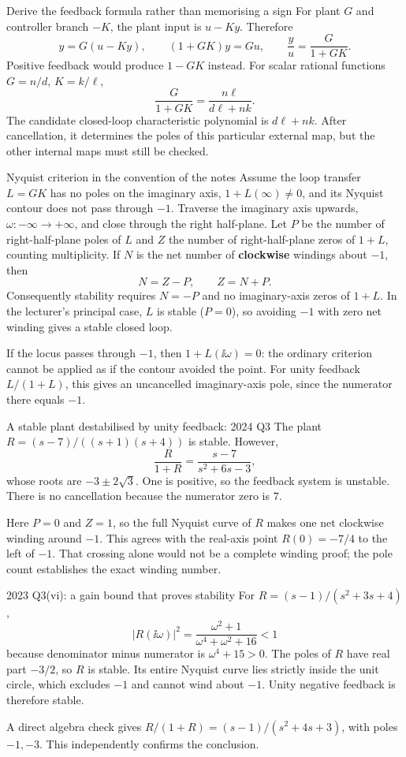 \begin{concept}{Derive the feedback formula rather than memorising a sign}
For plant $G$ and controller branch $-K$, the plant input is $u-Ky$. Therefore
\[y=G(u-Ky),\qquad (1+GK)y=Gu,\qquad \frac yu=\frac G{1+GK}.\]
Positive feedback would produce $1-GK$ instead. For scalar rational functions $G=n/d$, $K=k/\ell$,
\[\frac G{1+GK}=\frac{n\ell}{d\ell+nk}.\]
The candidate closed-loop characteristic polynomial is $d\ell+nk$. After cancellation, it determines the poles of this particular external map, but the other internal maps must still be checked.
\end{concept}
\begin{concept}{Nyquist criterion in the convention of the notes}
Assume the loop transfer $L=GK$ has no poles on the imaginary axis, $1+L(\infty)\ne0$, and its Nyquist contour does not pass through $-1$. Traverse the imaginary axis upwards, $\omega:-\infty\to+\infty$, and close through the right half-plane. Let $P$ be the number of right-half-plane poles of $L$ and $Z$ the number of right-half-plane zeros of $1+L$, counting multiplicity. If $N$ is the net number of \textbf{clockwise} windings about $-1$, then
\[N=Z-P,\qquad Z=N+P.\]
Consequently stability requires $N=-P$ and no imaginary-axis zeros of $1+L$. In the lecturer's principal case, $L$ is stable ($P=0$), so avoiding $-1$ with zero net winding gives a stable closed loop.

If the locus passes through $-1$, then $1+L(\ii\omega)=0$: the ordinary criterion cannot be applied as if the contour avoided the point. For unity feedback $L/(1+L)$, this gives an uncancelled imaginary-axis pole, since the numerator there equals $-1$.
\end{concept}
\begin{worked}{A stable plant destabilised by unity feedback: 2024 Q3}
The plant $R=(s-7)/((s+1)(s+4))$ is stable. However,
\[\frac R{1+R}=\frac{s-7}{s^2+6s-3},\]
whose roots are $-3\pm2\sqrt3$. One is positive, so the feedback system is unstable. There is no cancellation because the numerator zero is $7$.

Here $P=0$ and $Z=1$, so the full Nyquist curve of $R$ makes one net clockwise winding around $-1$. This agrees with the real-axis point $R(0)=-7/4$ to the left of $-1$. That crossing alone would not be a complete winding proof; the pole count establishes the exact winding number.
\end{worked}
\begin{worked}{2023 Q3(vi): a gain bound that proves stability}
For $R=(s-1)/(s^2+3s+4)$,
\[|R(\ii\omega)|^2=\frac{\omega^2+1}{\omega^4+\omega^2+16}<1\]
because denominator minus numerator is $\omega^4+15>0$. The poles of $R$ have real part $-3/2$, so $R$ is stable. Its entire Nyquist curve lies strictly inside the unit circle, which excludes $-1$ and cannot wind about $-1$. Unity negative feedback is therefore stable.

A direct algebra check gives $R/(1+R)=(s-1)/(s^2+4s+3)$, with poles $-1,-3$. This independently confirms the conclusion.
\end{worked}
